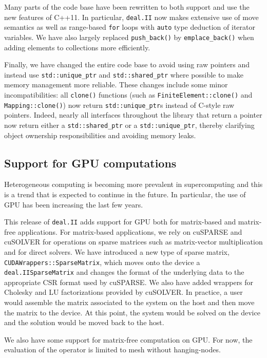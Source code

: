 \documentclass{ansarticle-preprint}
\newcommand{\specialword}[1]{\texttt{#1}}
\newcommand{\dealii}{{\specialword{deal.II}}\xspace}
\begin{document}
Many parts of the code base have been rewritten to both support and
use the new features of C++11. In particular, \dealii now makes
extensive use of move semantics as well as range-based \texttt{for}
loops with \texttt{auto} type deduction of iterator variables. We have
also largely replaced \texttt{push\_back()} by
\texttt{emplace\_back()} when adding elements to collections more
efficiently.

Finally, we have changed the entire code base to avoid using raw
pointers and instead use \texttt{std::unique\_ptr} and
\texttt{std::shared\_ptr} where possible to make memory management
more reliable. These changes include some minor incompatibilities: all
\texttt{clone()} functions (such as \texttt{FiniteElement::clone()} and
\texttt{Mapping::clone()}) now return \texttt{std::unique\_ptr}s instead of
C-style raw pointers. Indeed, nearly all interfaces throughout the library that return a pointer
now return either a \texttt{std::shared\_ptr} or a \texttt{std::unique\_ptr},
thereby clarifying object ownership responsibilities and avoiding memory leaks.


\subsection{Support for GPU computations}

Heterogeneous computing is becoming more prevalent in supercomputing and this is
a trend that is expected to continue in the future. In particular, the use of
GPU has been increasing the last few years.

This release of \dealii adds support for GPU both for matrix-based and
matrix-free applications. For matrix-based applications, we rely on
cuSPARSE\cite{cusparse} and cuSOLVER\cite{cusolver} for operations on sparse
matrices such as matrix-vector multiplication and for direct solvers. We have
introduced a new type of sparse matrix, \texttt{CUDAWrappers::SparseMatrix},
which moves onto the device a \dealii \texttt{SparseMatrix} and changes the
format of the underlying data to the appropriate CSR format used by cuSPARSE. We
also have added wrappers for Cholesky and LU factorizations provided by
cuSOLVER. In practice, a user would assemble the matrix associated to the system
on the host and then move the matrix to the device. At this point, the system
would be solved on the device and the solution would be moved back to the host.

We also have some support for matrix-free computation on GPU. For now, the
evaluation of the operator is limited to mesh without hanging-nodes.
\end{document}
